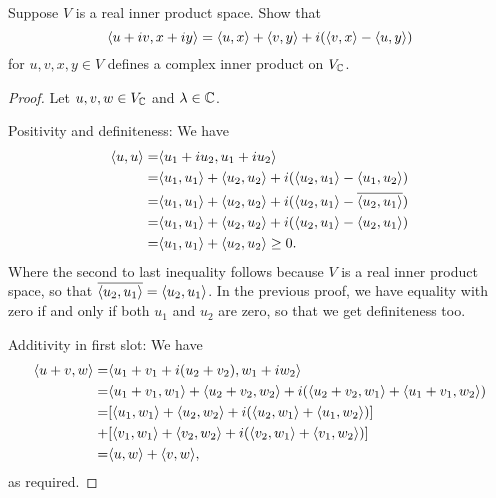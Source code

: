 \begin{exercise}{3}
  Suppose $V$ is a real inner product space. Show that
  \[
  \langle u+iv,x+iy\rangle = 
  \langle u,x\rangle+\langle v,y\rangle
  + i(\langle v,x\rangle-\langle u,y\rangle)
  \]
  for $u,v,x,y\in V$ defines a complex inner product on $V_{\mathbb{C}}$.
\end{exercise}
\begin{proof}
Let $u,v,w\in V_{\mathbb{C}}$ and $\lambda\in\mathbb{C}$.

 Positivity and definiteness: We have 
 \begin{align*}
    \langle u,u\rangle =& \langle u_1+iu_2, u_1+iu_2\rangle\\
    =& \langle u_1,u_1\rangle + \langle u_2,u_2\rangle 
    + i(\langle u_2,u_1\rangle-\langle u_1,u_2\rangle)\\
    =& \langle u_1,u_1\rangle + \langle u_2,u_2\rangle 
    + i(\langle u_2,u_1\rangle-\overline{\langle u_2,u_1\rangle})\\
    =& \langle u_1,u_1\rangle + \langle u_2,u_2\rangle 
    + i(\langle u_2,u_1\rangle-\langle u_2,u_1\rangle)\\
    =& \langle u_1,u_1\rangle + \langle u_2,u_2\rangle \geq 0.
 \end{align*}
 Where the second to last inequality follows because $V$ is a real inner product space, so that $\overline{\langle u_2,u_1\rangle} =\langle u_2,u_1\rangle$. In the previous proof, we have equality with zero if and only if both $u_1$ and $u_2$ are zero, so that we get definiteness too.

 Additivity in first slot: We have
 \begin{align*}
     \langle u+v,w\rangle =& \langle u_1+v_1+i(u_2+v_2), w_1+iw_2\rangle\\
     =& \langle u_1+v_1,w_1\rangle + \langle u_2+v_2,w_2\rangle
     + i(\langle u_2+v_2,w_1\rangle + \langle u_1+v_1,w_2\rangle)\\
     =& [\langle u_1,w_1\rangle + \langle u_2,w_2\rangle
     + i(\langle u_2,w_1\rangle + \langle u_1,w_2\rangle)]\\
     +& [\langle v_1,w_1\rangle + \langle v_2,w_2\rangle
     + i(\langle v_2,w_1\rangle + \langle v_1,w_2\rangle)]\\
     =& \langle u,w\rangle + \langle v,w\rangle,
 \end{align*}
 as required.


\end{proof}
